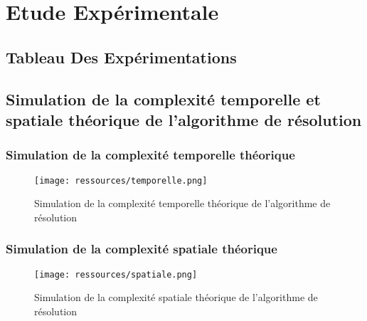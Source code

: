 \chapter{Etude Expérimentale}
\section{Tableau Des Expérimentations}

\par
{}

\section{Simulation de la complexité temporelle et spatiale théorique de l’algorithme de résolution}
\subsection{Simulation de la complexité temporelle théorique}
\begin{figure}[H]
    \centering
        \texttt{[image: ressources/temporelle.png]}
        \caption{{Simulation de la complexité temporelle théorique de l’algorithme de résolution }}
    \label{fig:insertch}
\end{figure}
\par
\subsection{Simulation de la complexité spatiale théorique }
\begin{figure}[H]
    \centering
        \texttt{[image: ressources/spatiale.png]}
        \caption{{Simulation de la complexité spatiale théorique de l’algorithme de résolution }}
    \label{fig:insertch}
\end{figure}
\par
